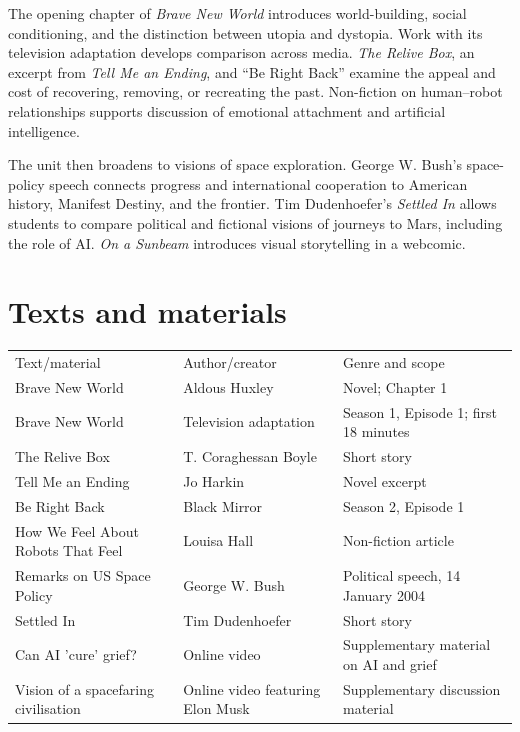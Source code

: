 \documentclass[11pt,a4paper,oneside]{book}
\begin{document}
The opening chapter of \emph{Brave New World} introduces world-building, social conditioning, and the distinction between utopia and dystopia. Work with its television adaptation develops comparison across media. \emph{The Relive Box}, an excerpt from \emph{Tell Me an Ending}, and “Be Right Back” examine the appeal and cost of recovering, removing, or recreating the past. Non-fiction on human–robot relationships supports discussion of emotional attachment and artificial intelligence.

The unit then broadens to visions of space exploration. George W. Bush's space-policy speech connects progress and international cooperation to American history, Manifest Destiny, and the frontier. Tim Dudenhoefer's \emph{Settled In} allows students to compare political and fictional visions of journeys to Mars, including the role of AI. \emph{On a Sunbeam} introduces visual storytelling in a webcomic.


\section*{Texts and materials}

{\small\setlength{\tabcolsep}{4pt}\renewcommand{\arraystretch}{1.15}\begin{tabularx}{\linewidth}{@{}>{\raggedright\arraybackslash}X>{\raggedright\arraybackslash}X>{\raggedright\arraybackslash}X@{}}\toprule
Text/material & Author/creator & Genre and scope\\
Brave New World & Aldous Huxley & Novel; Chapter 1\\
Brave New World & Television adaptation & Season 1, Episode 1; first 18 minutes\\
The Relive Box & T. Coraghessan Boyle & Short story\\
Tell Me an Ending & Jo Harkin & Novel excerpt\\
Be Right Back & Black Mirror & Season 2, Episode 1\\
How We Feel About Robots That Feel & Louisa Hall & Non-fiction article\\
Remarks on US Space Policy & George W. Bush & Political speech, 14 January 2004\\
Settled In & Tim Dudenhoefer & Short story\\
Can AI 'cure' grief? & Online video & Supplementary material on AI and grief\\
Vision of a spacefaring civilisation & Online video featuring Elon Musk & Supplementary discussion material\\
\bottomrule\end{tabularx}}\par\medskip
\end{document}
